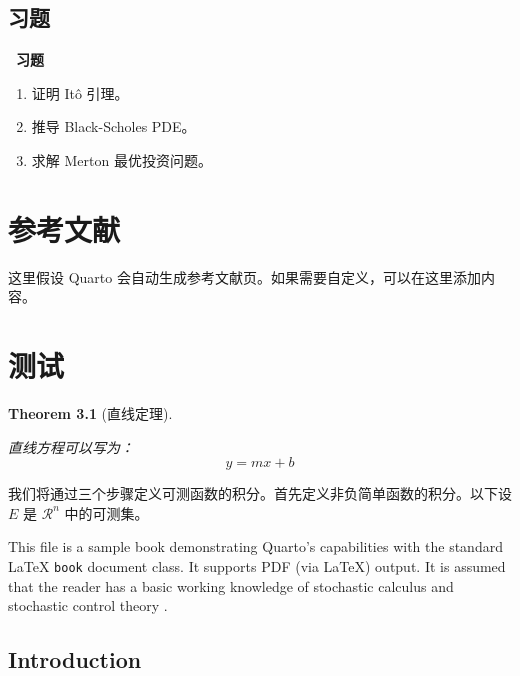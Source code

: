 \documentclass[
  11pt,
  letterpaper,
  oneside,
  a4paper]{book}
\makeatletter
\providecommand{\tightlist}{%
  \setlength{\itemsep}{0pt}\setlength{\parskip}{0pt}}
\newcounter{problem}[chapter]
\newenvironment{problemset}[1][习题]{
  \vspace*{10pt}
  \begin{center}
    \textcolor{structurecolor}{\Large\bfseries\adftripleflourishleft~#1~\adftripleflourishright}
  \end{center}}{
  \par}
\numberwithin{equation}{chapter}
\def\cleardoublepage{\clearpage\ifodd\c@page\else
    \hbox{}\thispagestyle{empty}\newpage\fi}
\let\oldchapter\chapter
\renewcommand{\chapter}{%
    \cleardoublepage
    \oldchapter
  }%
\theoremstyle{plain}
\theoremstyle{definition}
\theoremstyle{plain}
\theoremstyle{plain}
\theoremstyle{plain}
\newtheorem{theorem}{Theorem}[chapter]
\theoremstyle{remark}
\makeatother
\begin{document}
\section{习题}\label{ux4e60ux9898}

\begin{problemset}

\begin{enumerate}
\def\labelenumi{\arabic{enumi}.}
\tightlist
\item
  证明 Itô 引理。
\item
  推导 Black-Scholes PDE。
\item
  求解 Merton 最优投资问题。
\end{enumerate}

\end{problemset}


\chapter{参考文献}\label{ux53c2ux8003ux6587ux732e}

这里假设 Quarto
会自动生成参考文献页。如果需要自定义，可以在这里添加内容。


\chapter{测试}\label{ux6d4bux8bd5}

\begin{theorem}[直线定理]\protect\hypertarget{thm-line}{}\label{thm-line}

直线方程可以写为： \[ y = mx + b \]

\end{theorem}

我们将通过三个步骤定义可测函数的积分。首先定义非负简单函数的积分。以下设
\(E\) 是 \(\mathcal{R}^n\) 中的可测集。

This file is a sample book demonstrating Quarto's capabilities with the
standard LaTeX \texttt{book} document class. It supports PDF (via LaTeX)
output. It is assumed that the reader has a basic working knowledge of
stochastic calculus \citet{karatzas1991brownian} and stochastic control
theory \citet{yong1999sch}.

\section{Introduction}\label{introduction-2}
\end{document}

